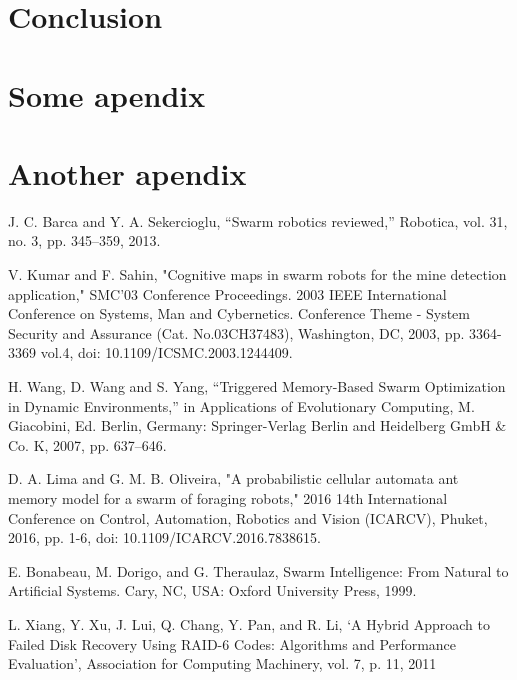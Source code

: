 \documentclass{UoYCSproject}
\begin{document}


\chapter{Conclusion}
\label{cha:conclusion}


\appendix
\chapter{Some apendix}


\chapter{Another apendix}


\begin{thebibliography}{100}
J. C. Barca and Y. A. Sekercioglu, “Swarm robotics reviewed,” Robotica, vol. 31, no. 3, pp. 345–359, 2013.

V. Kumar and F. Sahin, "Cognitive maps in swarm robots for the mine detection application," SMC'03 Conference Proceedings. 2003 IEEE International Conference on Systems, Man and Cybernetics. Conference Theme - System Security and Assurance (Cat. No.03CH37483), Washington, DC, 2003, pp. 3364-3369 vol.4, doi: 10.1109/ICSMC.2003.1244409.

H. Wang, D. Wang and S. Yang, “Triggered Memory-Based Swarm Optimization in Dynamic Environments,” in Applications of Evolutionary Computing, M. Giacobini, Ed. Berlin, Germany: Springer-Verlag Berlin and Heidelberg GmbH \& Co. K, 2007, pp. 637–646.

D. A. Lima and G. M. B. Oliveira, "A probabilistic cellular automata ant memory model for a swarm of foraging robots," 2016 14th International Conference on Control, Automation, Robotics and Vision (ICARCV), Phuket, 2016, pp. 1-6, doi: 10.1109/ICARCV.2016.7838615.

E. Bonabeau, M. Dorigo, and G. Theraulaz, Swarm Intelligence: From Natural to Artificial Systems. Cary, NC, USA: Oxford University Press, 1999.

L. Xiang, Y. Xu, J. Lui, Q. Chang, Y. Pan, and R. Li, ‘A Hybrid Approach to Failed Disk Recovery Using RAID-6 Codes: Algorithms and Performance Evaluation’, Association for Computing Machinery, vol. 7, p. 11, 2011


\end{thebibliography}
\end{document}
